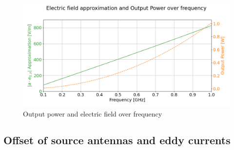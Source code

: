 \begin{figure}[h]
    \centering
    \includegraphics[width=1\linewidth]{Documentation//content//30_simulations//img/e_field_power_cfd.png}
    \caption{Output power and electric field over frequency}
    \label{fig:e_field_power_cfd}
\end{figure}


\subsection{Offset of source antennas and eddy currents}
